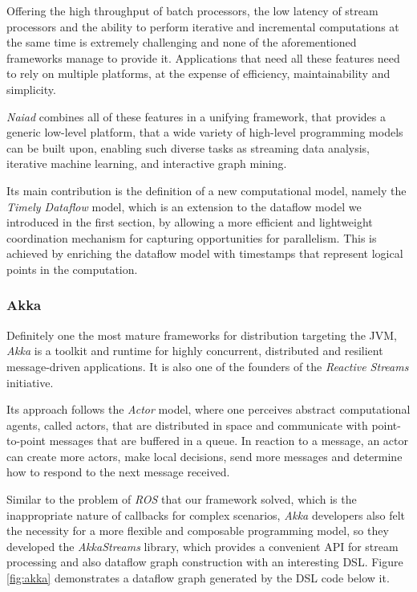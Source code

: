 \documentclass[sigplan,review,anonymous]{acmart}\settopmatter{printfolios=true,printacmref=false}
\begin{document}
Offering the high throughput of batch processors, the low latency of stream processors and the ability to perform iterative and incremental computations at the same time is extremely challenging and none of the aforementioned frameworks manage to provide it. Applications that need all these features need to rely on multiple platforms, at the expense of efficiency, maintainability and simplicity.

\textit{Naiad}\cite{naiad} combines all of these features in a unifying framework, that provides a generic low-level platform, that a wide variety of high-level programming models can be built upon, enabling such diverse tasks as streaming data analysis, iterative machine learning, and interactive graph mining.

Its main contribution is the definition of a new computational model, namely the \textit{Timely Dataflow} model, which is an extension to the dataflow model we introduced in the first section, by allowing a more efficient and lightweight coordination mechanism for capturing opportunities for parallelism. This is achieved by enriching the dataflow model with timestamps that represent logical points in the computation.

\subsubsection{Akka}

Definitely one the most mature frameworks for distribution targeting the JVM, \textit{Akka} is a toolkit and runtime for highly concurrent, distributed and resilient message-driven applications. It is also one of the founders of the \textit{Reactive Streams}\cite{rss} initiative.

Its approach follows the \textit{Actor} model\cite{actor}, where one perceives abstract computational agents, called actors, that are distributed in space and communicate with point-to-point messages that are buffered in a queue. In reaction to a message, an actor can create more actors, make local decisions, send more messages and determine how to respond to the next message received.

Similar to the problem of \textit{ROS} that our framework solved, which is the inappropriate nature of callbacks for complex scenarios, \textit{Akka} developers also felt the necessity for a more flexible and composable programming model, so they developed the \textit{AkkaStreams} library, which provides a convenient API for stream processing and also dataflow graph construction with an interesting DSL. Figure \ref{fig:akka} demonstrates a dataflow graph generated by the DSL code below it.
\end{document}
